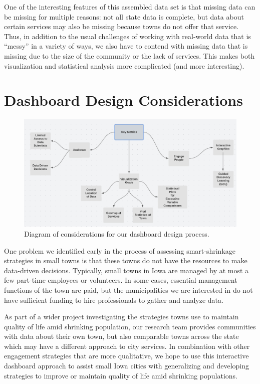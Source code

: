 \documentclass[print]{nuthesis}
\begin{document}
One of the interesting features of this assembled data set is that missing data can be missing for multiple reasons: not all state data is complete, but data about certain services may also be missing because towns do not offer that service.
Thus, in addition to the usual challenges of working with real-world data that is ``messy'' in a variety of ways, we also have to contend with missing data that is missing due to the size of the community or the lack of services. This makes both visualization and statistical analysis more complicated (and more interesting).

\hypertarget{dashboard-design-considerations}{%
\section{Dashboard Design Considerations}\label{dashboard-design-considerations}}

\begin{figure}
\hypertarget{fig:metrics}{%
\centering
\includegraphics{figure/KeyMetrics.png}
\caption{Diagram of considerations for our dashboard design process.}\label{fig:metrics}
}
\end{figure}

One problem we identified early in the process of assessing smart-shrinkage strategies in small towns is that these towns do not have the resources to make data-driven decisions. Typically, small towns in Iowa are managed by at most a few part-time employees or volunteers. In some cases, essential management functions of the town are paid, but the municipalities we are interested in do not have sufficient funding to hire professionals to gather and analyze data.

As part of a wider project investigating the strategies towns use to maintain quality of life amid shrinking population, our research team provides communities with data about their own town, but also comparable towns across the state which may have a different approach to city services. In combination with other engagement strategies that are more qualitative, we hope to use this interactive dashboard approach to assist small Iowa cities with generalizing and developing strategies to improve or maintain quality of life amid shrinking populations.
\end{document}
